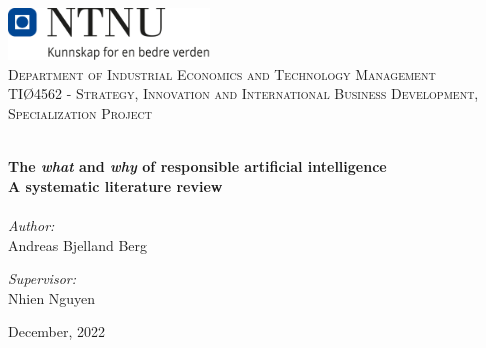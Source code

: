
\begin{titlepage}
\vbox{ }
\vbox{ }
\begin{center}
\includegraphics[width=0.40\textwidth]{Images/NTNU_logo.png}\\[1cm]
\textsc{\LARGE Department of Industrial Economics and Technology Management}\\[1.5cm]
\textsc{\Large TIØ4562 - Strategy, Innovation and International Business Development, Specialization Project}\\[0.5cm]
\vbox{ }

\HRule \\[0.4cm]
{ \huge \bfseries The \textit{what} and \textit{why} of responsible artificial intelligence}\\[0.4cm]
{ \LARGE \bfseries A systematic literature review}\\[0.4cm]
\HRule \\[1.5cm]

\large
\emph{Author:}\\
Andreas Bjelland Berg

\emph{Supervisor:}\\
Nhien Nguyen
\vfill

{\large December, 2022}
\end{center}
\end{titlepage}
